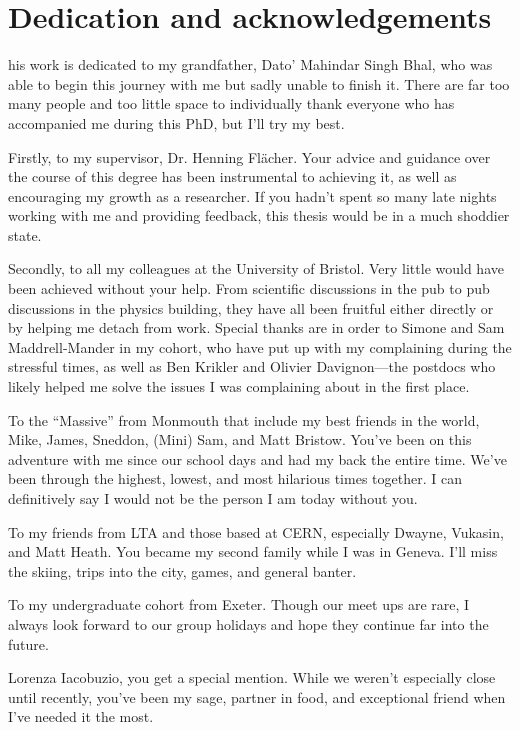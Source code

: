 %
%

\chapter*{Dedication and acknowledgements}
\begin{SingleSpace}
his work is dedicated to my grandfather, Dato' Mahindar Singh Bhal, who was able to begin this journey with me but sadly unable to finish it. There are far too many people and too little space to individually thank everyone who has accompanied me during this PhD, but I'll try my best.

Firstly, to my supervisor, Dr. Henning Fl\"{a}cher. Your advice and guidance over the course of this degree has been instrumental to achieving it, as well as encouraging my growth as a researcher. If you hadn't spent so many late nights working with me and providing feedback, this thesis would be in a much shoddier state.

Secondly, to all my colleagues at the University of Bristol. Very little would have been achieved without your help. From scientific discussions in the pub to pub discussions in the physics building, they have all been fruitful either directly or by helping me detach from work. Special thanks are in order to Simone and Sam Maddrell-Mander in my cohort, who have put up with my complaining during the stressful times, as well as Ben Krikler and Olivier Davignon---the postdocs who likely helped me solve the issues I was complaining about in the first place.

To the ``Massive'' from Monmouth that include my best friends in the world, Mike, James, Sneddon, (Mini) Sam, and Matt Bristow. You've been on this adventure with me since our school days and had my back the entire time. We've been through the highest, lowest, and most hilarious times together. I can definitively say I would not be the person I am today without you.

To my friends from LTA and those based at CERN, especially Dwayne, Vukasin, and Matt Heath. You became my second family while I was in Geneva. I'll miss the skiing, trips into the city, games, and general banter.

To my undergraduate cohort from Exeter. Though our meet ups are rare, I always look forward to our group holidays and hope they continue far into the future.

Lorenza Iacobuzio, you get a special mention. While we weren't especially close until recently, you've been my sage, partner in food, and exceptional friend when I've needed it the most.


\end{SingleSpace}
